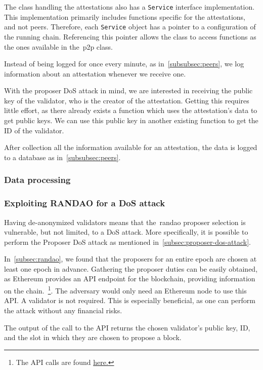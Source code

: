 The class handling the attestations also has a \texttt{Service} interface implementation.
This implementation primarily includes functions specific for the attestations, and not peers.
Therefore, each \texttt{Service} object has a pointer to a configuration of the running chain.
Referencing this pointer allows the class to access functions as the ones available in the~\gls{p2p} class.

Instead of being logged for once every minute, as in~\autoref{subsubsec:peers},
we log information about an attestation whenever we receive one.

With the proposer DoS attack in mind, we are interested in receiving the public key of the validator,
who is the creator of the attestation.
Getting this requires little effort,
as there already exists a function which uses the attestation's data to get public keys.
We can use this public key in another existing function to get the ID of the validator.

After collection all the information available for an attestation,
the data is logged to a database as in~\autoref{subsubsec:peers}.

\subsubsection{Data processing}

\subsubsection{Exploiting RANDAO for a DoS attack}
Having de-anonymized validators means that the~\gls{randao} proposer selection is vulnerable, but not limited, to a DoS attack.
More specifically, it is possible to perform the Proposer DoS attack as mentioned in~\autoref{subsec:proposer-dos-attack}.

In~\autoref{subsec:randao}, we found that the proposers for an entire epoch are chosen at least one epoch in advance.
Gathering the proposer duties can be easily obtained, as Ethereum provides an API endpoint for the blockchain, providing information on the chain.~\footnote{The API calls are found \href{https://ethereum.github.io/beacon-APIs/\#/Validator/getProposerDuties}{here.}}.
The adversary would only need an Ethereum node to use this API.
A validator is not required.
This is especially beneficial, as one can perform the attack without any financial risks.

The output of the call to the API returns the chosen validator's public key, ID, and the slot in which they are chosen to propose a block.

